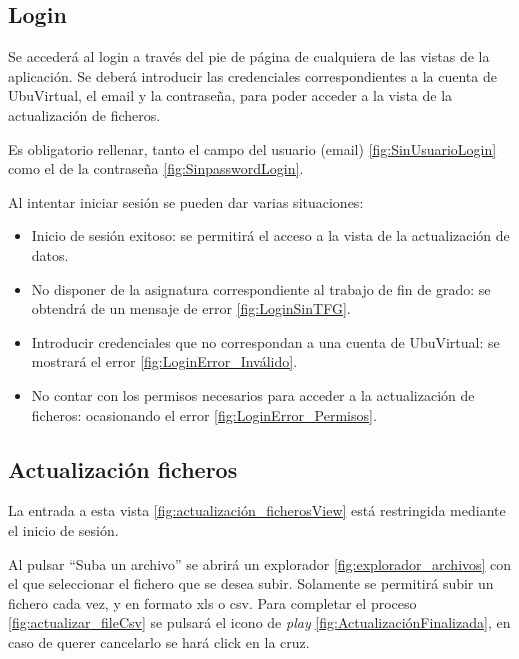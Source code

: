 \subsection{Login} 
Se accederá al login a través del pie de página de cualquiera de las vistas de la aplicación. Se deberá introducir las credenciales correspondientes a la cuenta de UbuVirtual, el email y la contraseña, para poder acceder a la vista de la actualización de ficheros.

Es obligatorio rellenar, tanto el campo del usuario (email) \ref{fig:SinUsuarioLogin} como el de la contraseña \ref{fig:SinpasswordLogin}.

Al intentar iniciar sesión se pueden dar varias situaciones:
\begin{itemize}
	\item Inicio de sesión exitoso: se permitirá el acceso a la vista de la actualización de datos.	
	\item No disponer de la asignatura correspondiente al trabajo de fin de grado: se obtendrá de un mensaje de error \ref{fig:LoginSinTFG}.  	
	\item Introducir credenciales que no correspondan a una cuenta de UbuVirtual: se mostrará el error \ref{fig:LoginError_Inválido}.	
	\item No contar con los permisos necesarios para acceder a la actualización de ficheros: ocasionando el error \ref{fig:LoginError_Permisos}.
\end{itemize}

\subsection{Actualización ficheros} 
La entrada a esta vista \ref{fig:actualización_ficherosView} está restringida mediante el inicio de sesión.    


Al pulsar ``Suba un archivo'' se abrirá un explorador \ref{fig:explorador_archivos} con el que seleccionar el fichero que se desea subir. Solamente se permitirá subir un fichero cada vez, y en formato xls o csv. Para completar el proceso \ref{fig:actualizar_fileCsv} se pulsará el icono de \emph{play} \ref{fig:ActualizaciónFinalizada}, en caso de querer cancelarlo se hará click en la cruz.

